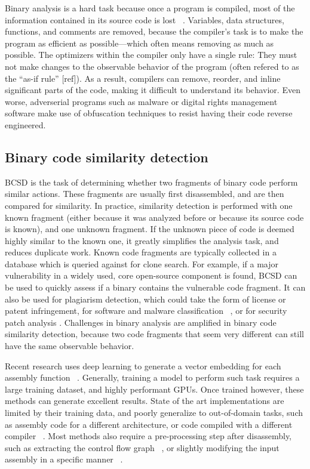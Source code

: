\documentclass[conference,compsoc]{IEEEtran}
\begin{document}
Binary analysis is a hard task because once a program is compiled, most of the information contained in its source code
is lost ~\cite{BCSDsurvey}. Variables, data structures, functions, and comments are removed, because the compiler's task is to make
the program as efficient as possible---which often means removing as much as possible. The optimizers within the compiler
only have a single rule: They must not make changes to the observable behavior of the program (often refered
to as the ``as-if rule'' [ref]). As a result, compilers can remove, reorder, and inline significant parts of the code, making
it difficult to understand its behavior. Even worse, adverserial programs such as malware or digital rights management software
make use of obfuscation techniques to resist having their code reverse engineered.

\subsection{Binary code similarity detection}

BCSD is the task of determining whether two fragments of binary code perform similar actions.
These fragments are usually first disassembled, and are then compared for similarity. In practice,
similarity detection is performed with one known fragment (either because it was analyzed before
or because its source code is known), and one unknown fragment. If the unknown piece of code is deemed
highly similar to the known one, it greatly simplifies the analysis task, and reduces duplicate work. Known
code fragments are typically collected in a database which is queried against for clone search. For example,
if a major vulnerability in a widely used, core open-source component is found, BCSD can be used to quickly
assess if a binary contains the vulnerable code fragment. It can also be used for plagiarism detection, which
could take the form of license or patent infringement, for software and malware classification ~\cite{op-seq}, or for 
security patch analysis \cite{patch}. Challenges in binary analysis are amplified in binary code similarity detection,
because two code fragments that seem very different can still have the same observable behavior.

Recent research uses deep learning to generate a vector embedding for each assembly function ~\cite{SAFE,PalmTree,OrderMatters,Asm2Vec,CLAP}.
Generally, training a model to perform such task requires a large training dataset, and highly performant GPUs.
Once trained however, these methods can generate excellent results.
State of the art implementations are limited by their training data, and poorly generalize to out-of-domain tasks,
such as assembly code for a different architecture, or code compiled with a different compiler ~\cite{BCSDsurvey,CLAP}.
Most methods also require a pre-processing step after disassembly, such as extracting the control flow graph
~\cite{OrderMatters,Asm2Vec}, or slightly modifying the input assembly in a specific manner ~\cite{PalmTree,CLAP}.
\end{document}
